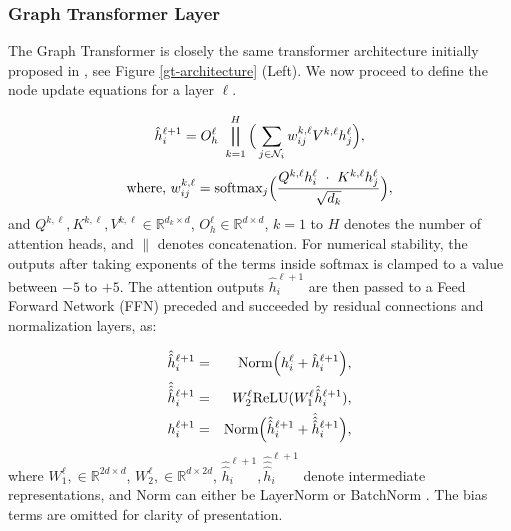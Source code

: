 \documentclass[letterpaper]{article} %
\begin{document}
\subsubsection{Graph Transformer Layer} The Graph Transformer is closely the same transformer architecture initially proposed in \cite{vaswani2017attention}, see Figure \ref{gt-architecture} (Left).
We now proceed to define the node update equations for a layer $\ell$. 

\begin{equation}
    \label{eqn:gt_layer}
    \hat{h}_{i}^{\ell+1} = O_h^{\ell} \ \bigparallel_{k=1}^{H} \Big(\sum_{j \in \mathcal{N}_i} w_{ij}^{k,\ell} V^{k,\ell}h_j^{\ell} \Big),
\end{equation}
\begin{equation}
    \label{eqn:softmax}
    \textnormal{where,} \ w_{ij}^{k,\ell} = \textnormal{softmax}_j \Big(\frac{Q^{k, \ell} h_i^{\ell} \ \cdot \ K^{k, \ell}h_j^{\ell}}{\sqrt{d_k}}  \Big),
\end{equation}
and $Q^{k,\ell}, K^{k,\ell}, V^{k,\ell} \in \mathbb{R}^{d_k \times d}$, $O_h^{\ell} \in \mathbb{R}^{d \times d}$, $k=1$ to $H$ denotes the number of attention heads, and $\|$ denotes concatenation. 
For numerical stability, the outputs after taking exponents of the terms inside softmax is clamped to a value between $-5$ to $+5$.
The attention outputs $\hat{h}_{i}^{\ell+1}$ are then passed to a Feed Forward Network (FFN) preceded and succeeded by residual connections and normalization layers, as:

\begin{eqnarray}
    \hat{\hat{h}}_{i}^{\ell+1} &=& \textnormal{Norm} \Big( h_{i}^{\ell} + \hat{h}_{i}^{\ell+1} \Big), \label{eqn:rc_norm1}\\
    \hat{\hat{\hat{h}}}_{i}^{\ell+1} &=& W_2^{\ell} \textnormal{ReLU}(W_1^{\ell} \hat{\hat{h}}_{i}^{\ell+1}), \label{eqn:ffn}\\
    h_{i}^{\ell+1} &=& \textnormal{Norm} \Big( \hat{\hat{h}}_{i}^{\ell+1} + \hat{\hat{\hat{h}}}_{i}^{\ell+1} \Big), \label{eqn:rc_norm2}
\end{eqnarray}
where $W_1^{\ell}, \in \mathbb{R}^{2d \times d}$, $W_2^{\ell}, \in \mathbb{R}^{d \times 2d}$, $\hat{\hat{h}}_{i}^{\ell+1}, \hat{\hat{\hat{h}}}_{i}^{\ell+1}$ denote intermediate representations, and  Norm can either be LayerNorm\cite{ba2016layer} or BatchNorm \cite{ioffe2015batch}. The bias terms are omitted for clarity of presentation.
\end{document}
